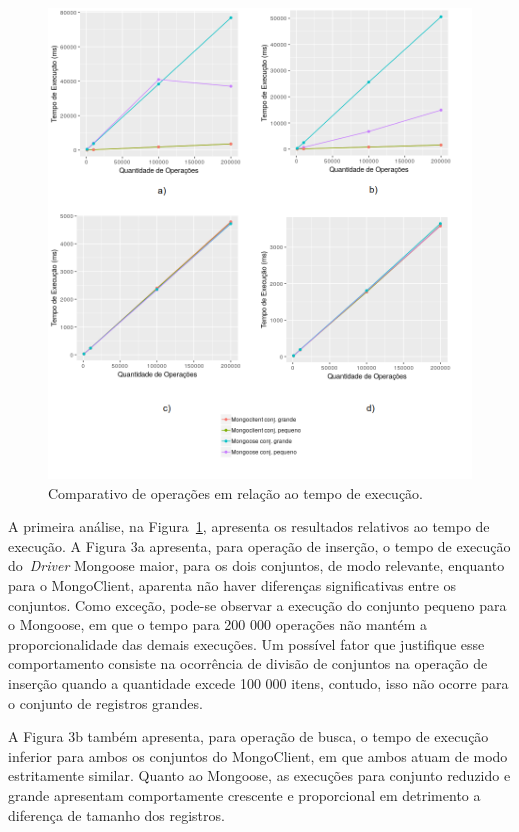 \documentclass[12pt]{article}
\begin{document}
\begin{figure}[!ht]
\centering
\includegraphics[width=\textwidth]{images/time}
\caption{Comparativo de operações em relação ao tempo de execução.}
\label{fig:time}
\end{figure}

A primeira análise, na Figura~\ref{fig:time}, apresenta os resultados relativos ao tempo de execução. 
A Figura 3a apresenta, para operação de inserção, o tempo de execução do~\emph{Driver} Mongoose maior, para os dois conjuntos, de modo relevante, enquanto para o MongoClient, aparenta não haver diferenças significativas entre os conjuntos. 
Como exceção, pode-se observar a execução do conjunto pequeno para o Mongoose, em que o tempo para 200 000 operações não mantém a proporcionalidade das demais execuções. Um possível fator que justifique esse comportamento consiste na ocorrência de divisão de conjuntos na operação de inserção quando a quantidade excede 100 000 itens, contudo, isso não ocorre para o conjunto de registros grandes.

A Figura 3b também apresenta, para operação de busca, o tempo de execução inferior para ambos os conjuntos do MongoClient, em que ambos atuam de modo estritamente similar. 
Quanto ao Mongoose, as execuções para conjunto reduzido e grande apresentam comportamente crescente e proporcional em detrimento a diferença de tamanho dos registros. 
\end{document}
